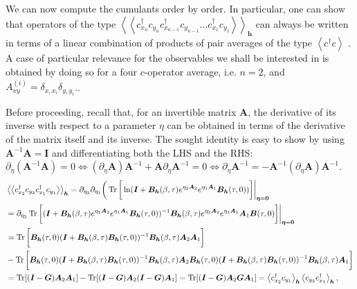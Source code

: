 We can now compute the cumulants order by order.
In particular, one can show that operators of the type 
$\left\langle \left\langle c_{x_n}^\dagger c_{y_n} c_{x_{n-1}}^\dagger c_{y_{n-1}} ... c_{x_1}^\dagger c_{y_1}  \right\rangle\right\rangle_{\bm h}$
can always be written in terms of a linear combination of products of pair averages of the type $\left\langle c^\dagger c \right\rangle$ \cite{f._assaad_quantum_2002}.
A case of particular relevance for the observables we shall be interested in is obtained by doing so for a four $c$-operator average, i.e. $n = 2$, and $A_{x y}^{(i)} = \delta_{x, x_i} \delta_{y, y_i}$..

Before proceeding, recall that, for an invertible matrix $\bm A$, the derivative of its inverse with respect to a parameter $\eta$ can be  obtained in terms of the derivative of the matrix itself and its inverse.
The sought identity is easy to show by using $\bm A^{-1} \bm A = \bm I$ and differentiating both the LHS and the RHS: $\partial_{\eta} ( \bm A^{-1} \bm A ) = 0 \iff ( \partial_\eta \bm A ) \bm A^{-1} + \bm A \partial_\eta \bm A^{-1} = 0 \iff \partial_\eta \bm A^{-1} = - \bm A^{-1} ( \partial_\eta \bm A ) \bm A^{-1}$.
\begin{equation}
\begin{split}
&\left\langle \left\langle c_{x_2}^\dagger c_{y_2} c_{x_1}^\dagger c_{y_1}  \right\rangle\right\rangle_{\bm h} = \partial_{\eta_2} \partial_{\eta_1} \bigg( \operatorname{Tr} \bigg[ \ln ( \bm I + \bm B_{\bm h} ( \beta, \tau ) e^{\eta_2 \bm A_2} e^{\eta_1 \bm A_1} \bm B_{\bm h} ( \tau, 0) ) \bigg] \bigg|_{\bm \eta = \bm 0 } \\
&= \partial_{\eta_2} \operatorname{Tr} \bigg[ ( \bm I + \bm B_{\bm h} ( \beta, \tau ) e^{\eta_2 \bm A_2} e^{\eta_1 \bm A_1} \bm B_{\bm h} ( \tau, 0) )^{-1} \bm B_{\bm h} ( \beta, \tau ) e^{\eta_2 \bm A_2} e^{\eta_1 \bm A_1} \bm A_1 \bm B ( \tau, 0 ) \bigg] \bigg|_{\bm \eta = \bm 0 } \\
&= \operatorname{Tr} \bigg [ \bm B_{\bm h} ( \tau, 0 ) ( \bm I + \bm B_{\bm h} ( \beta, \tau ) \bm B_{\bm h} ( \tau, 0) )^{-1} \bm B_{\bm h} ( \beta, \tau ) \bm A_2 \bm A_1  \bigg] \\
&- \operatorname{Tr} \bigg [ \bm B_{\bm h} ( \tau, 0 ) ( \bm I + \bm B_{\bm h} ( \beta, \tau ) \bm B_{\bm h} ( \tau, 0) )^{-1} \bm B_{\bm h} ( \beta, \tau ) \bm A_2 \bm B_{\bm h} ( \tau, 0 ) ( \bm I + \bm B_{\bm h} ( \beta, \tau ) \bm B_{\bm h} ( \tau, 0) )^{-1} \bm B_{\bm h} ( \beta, \tau ) \bm A_1  \bigg] \\
&= \operatorname{Tr} [ ( \bm I - \bm G ) \bm A_2 \bm A_1 ] - \operatorname{Tr} [ ( \bm I - \bm G ) \bm A_2 ( \bm I - \bm G ) \bm A_1 ] = \operatorname{Tr} [ ( \bm I - \bm G ) \bm A_2 \bm G \bm A_1 ] = \left\langle c_{x_2}^\dagger c_{y_1} \right\rangle_{\bm h} \left\langle c_{y_2} c_{x_1}^\dagger \right\rangle_{\bm h} ,
\end{split}
\end{equation}
